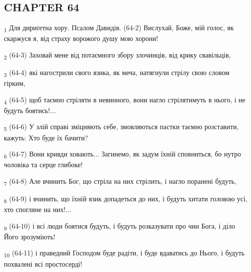 \subsection{CHAPTER 64}
\begin{tcolorbox}
\textsubscript{1} Для дириґетна хору. Псалом Давидів. (64-2) Вислухай, Боже, мій голос, як скаржуся я, від страху ворожого душу мою хорони!
\end{tcolorbox}
\begin{tcolorbox}
\textsubscript{2} (64-3) Заховай мене від потаємного збору злочинців, від крику свавільців,
\end{tcolorbox}
\begin{tcolorbox}
\textsubscript{3} (64-4) які нагострили свого язика, як меча, натягнули стрілу свою словом гірким,
\end{tcolorbox}
\begin{tcolorbox}
\textsubscript{4} (64-5) щоб таємно стріляти в невинного, вони нагло стрілятимуть в нього, і не будуть боятись!...
\end{tcolorbox}
\begin{tcolorbox}
\textsubscript{5} (64-6) У злій справі зміцняють себе, змовляються пастки таємно розставити, кажуть: Хто буде їх бачити?
\end{tcolorbox}
\begin{tcolorbox}
\textsubscript{6} (64-7) Вони кривди ховають... Загинемо, як задум їхній сповниться, бо нутро чоловіка та серце глибоке!
\end{tcolorbox}
\begin{tcolorbox}
\textsubscript{7} (64-8) Але вчинить Бог, що стріла на них стрілить, і нагло поранені будуть,
\end{tcolorbox}
\begin{tcolorbox}
\textsubscript{8} (64-9) і вчинить, що їхній язик допадеться до них, і будуть хитати головою усі, хто спогляне на них!...
\end{tcolorbox}
\begin{tcolorbox}
\textsubscript{9} (64-10) і всі люди боятися будуть, і будуть розказувати про чин Бога, і діло Його зрозуміють!
\end{tcolorbox}
\begin{tcolorbox}
\textsubscript{10} (64-11) і праведний Господом буде радіти, і буде вдаватись до Нього, і будуть похвалені всі простосерді!
\end{tcolorbox}
